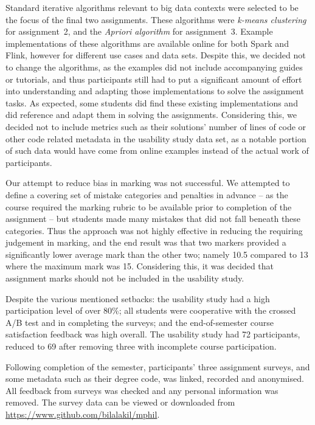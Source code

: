   Standard iterative algorithms relevant to big data contexts were selected to be the focus of the final two assignments. These algorithms were \emph{k-means clustering} \cite{hartigan1979algorithm} for assignment~2, and the \emph{Apriori algorithm} \cite{agrawal1994fast} for assignment~3. Example implementations of these algorithms are available online for both Spark and Flink, however for different use cases and data sets. Despite this, we decided not to change the algorithms, as the examples did not include accompanying guides or tutorials, and thus participants still had to put a significant amount of effort into understanding and adapting those implementations to solve the assignment tasks. As expected, some students did find these existing implementations and did reference and adapt them in solving the assignments. Considering this, we decided not to include metrics such as their solutions' number of lines of code or other code related metadata in the usability study data set, as a notable portion of such data would have come from online examples instead of the actual work of participants.

  Our attempt to reduce bias in marking was not successful. We attempted to define a covering set of mistake categories and penalties in advance -- as the course required the marking rubric to be available prior to completion of the assignment -- but students made many mistakes that did not fall beneath these categories. Thus the approach was not highly effective in reducing the requiring judgement in marking, and the end result was that two markers provided a significantly lower average mark than the other two; namely 10.5 compared to 13 where the maximum mark was 15. Considering this, it was decided that assignment marks should not be included in the usability study.
  
  Despite the various mentioned setbacks: the usability study had a high participation level of over 80\%; all students were cooperative with the crossed A/B test and in completing the surveys; and the end-of-semester course satisfaction feedback was high overall. The usability study had 72 participants, reduced to 69 after removing three with incomplete course participation.
  
  Following completion of the semester, participants' three assignment surveys, and some metadata such as their degree code, was linked, recorded and anonymised. All feedback from surveys was checked and any personal information was removed. The survey data can be viewed or downloaded from \url{https://www.github.com/bilalakil/mphil}.

